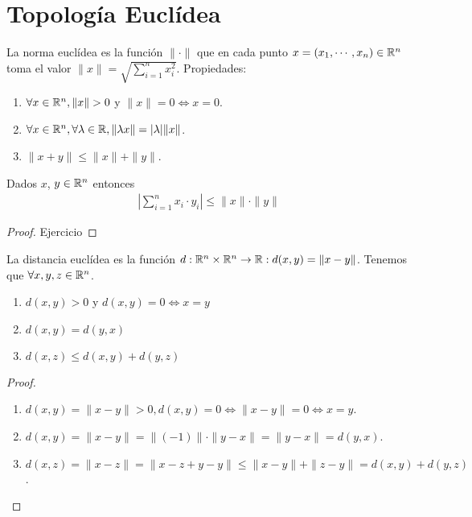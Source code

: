 \section{Topología Euclídea}

\begin{definition}
  La norma euclídea es la función $\| \cdot \|$ que en cada punto $x = (x_1, \cdots, x_n) \in \mathbb{R}^n$ toma el valor $\|x\| = \sqrt{\sum_{i = 1}^n x_i^2}$.
  Propiedades: \begin{enumerate}
    \item $\forall x \in \mathbb{R}^n, \|x\| > 0$ y $\|x\| = 0 \iff x = 0$.
    \item $\forall x \in \mathbb{R}^n, \forall \lambda \in \mathbb{R}, \| \lambda x\| = |\lambda| \|x\|$.
    \item $\|x+y\| \leq \|x\| + \|y\|$.
  \end{enumerate}
\end{definition}

\begin{prop}
  Dados $x$, $y \in \mathbb{R}^n$ entonces \begin{align*}
    \left| \sum_{i = 1}^n x_i \cdot y_i \right| \leq \|x\| \cdot \|y\|
  \end{align*}
  \begin{proof}
    Ejercicio
  \end{proof}
\end{prop}

\begin{definition}
  La distancia euclídea es la función $d: \mathbb{R}^n \times \mathbb{R}^n \to \mathbb{R} : d(x, y) = \|x-y\|$.
  Tenemos que $\forall x,y,z \in \mathbb{R}^n$.
  \begin{enumerate}
    \item $d(x, y) > 0$ y $d(x, y) = 0 \iff x=y$
    \item $d(x, y) = d(y, x)$
    \item $d(x, z) \leq d(x, y) + d(y, z)$
  \end{enumerate}
  \begin{proof}
    \begin{enumerate}
      \item $d(x, y) = \|x-y\| > 0, d(x, y) = 0 \iff \|x-y\| = 0 \iff x = y$.
      \item $d(x, y) = \|x-y\| = \|(-1)\| \cdot \|y-x\| = \|y-x\| = d(y, x)$.
      \item $d(x, z) = \|x-z\| = \|x-z+y-y\| \leq \|x-y\| + \|z-y\| = d(x, y) + d(y, z)$.
    \end{enumerate}
  \end{proof}
\end{definition}

